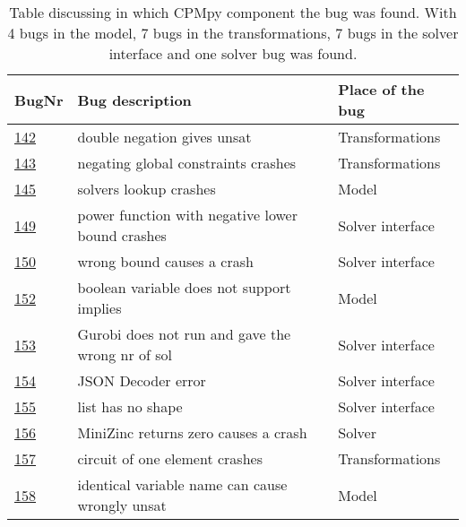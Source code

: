 \begin{table}[]
	\centering
	\caption{Table discussing in which CPMpy component the bug was found. With 4 bugs in the model, 7 bugs in the transformations, 7 bugs in the solver interface and one solver bug was found.}
	\label{tab:bug:placeComponent}
	\begin{tabular}{lll}
		\hline
		BugNr & Bug description                                         & Place of the bug \\ \toprule
		\href{https://github.com/CPMpy/cpmpy/issues/142}{142} & double negation gives unsat                            & Transformations \\
		\href{https://github.com/CPMpy/cpmpy/issues/143}{143} & negating global constraints crashes                 & Transformations \\
		\href{https://github.com/CPMpy/cpmpy/issues/145}{145} & solvers lookup crashes                            & Model            \\
		\href{https://github.com/CPMpy/cpmpy/issues/149}{149} & power function with negative lower bound crashes  & Solver interface \\
		\href{https://github.com/CPMpy/cpmpy/issues/150}{150} & wrong bound causes a crash                        & Solver interface \\
		\href{https://github.com/CPMpy/cpmpy/issues/152}{152} & boolean variable does not support implies         & Model            \\
		\href{https://github.com/CPMpy/cpmpy/issues/153}{153} & Gurobi does not run and gave the wrong nr of sol  & Solver interface \\
		\href{https://github.com/CPMpy/cpmpy/issues/154}{154} & JSON Decoder error                                & Solver interface \\
		\href{https://github.com/CPMpy/cpmpy/issues/155}{155} & list has no shape                                 & Solver interface \\
		\href{https://github.com/CPMpy/cpmpy/issues/156}{156} & MiniZinc returns zero causes a crash              & Solver           \\
		\href{https://github.com/CPMpy/cpmpy/issues/157}{157} & circuit of one element crashes                    & Transformations  \\
		\href{https://github.com/CPMpy/cpmpy/issues/158}{158} & identical variable name can cause wrongly unsat   & Model            \\

\end{tabular}
\end{table}
